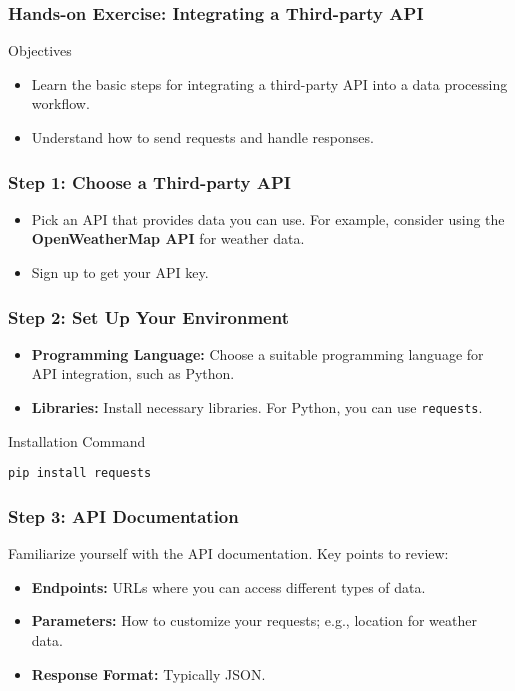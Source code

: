 \documentclass[aspectratio=169]{beamer}
\begin{document}
\begin{frame}
  \frametitle{Hands-on Exercise: Integrating a Third-party API}
  \begin{block}{Objectives}
    \begin{itemize}
      \item Learn the basic steps for integrating a third-party API into a data processing workflow.
      \item Understand how to send requests and handle responses.
    \end{itemize}
  \end{block}
\end{frame}

\begin{frame}[fragile]
  \frametitle{Step 1: Choose a Third-party API}
  \begin{itemize}
    \item Pick an API that provides data you can use. For example, consider using the \textbf{OpenWeatherMap API} for weather data.
    \item Sign up to get your API key.
  \end{itemize}
\end{frame}

\begin{frame}
  \frametitle{Step 2: Set Up Your Environment}
  \begin{itemize}
    \item \textbf{Programming Language:} Choose a suitable programming language for API integration, such as Python.
    \item \textbf{Libraries:} Install necessary libraries. For Python, you can use \texttt{requests}.
  \end{itemize}
  \begin{block}{Installation Command}
    \begin{lstlisting}
pip install requests
    \end{lstlisting}
  \end{block}
\end{frame}

\begin{frame}
  \frametitle{Step 3: API Documentation}
  Familiarize yourself with the API documentation. Key points to review:
  \begin{itemize}
    \item \textbf{Endpoints:} URLs where you can access different types of data.
    \item \textbf{Parameters:} How to customize your requests; e.g., location for weather data.
    \item \textbf{Response Format:} Typically JSON.
  \end{itemize}
\end{frame}
\end{document}
